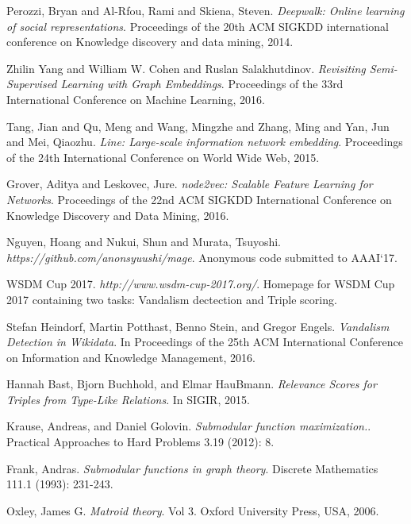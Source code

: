 \documentclass[12pt,twoside]{article}
\begin{document}
\begin{thebibliography}{99}

Perozzi, Bryan and Al-Rfou, Rami and Skiena, Steven. \textit{Deepwalk: Online learning of social representations}. Proceedings of the 20th ACM SIGKDD international conference on Knowledge discovery and data mining, 2014.

Zhilin Yang and William W. Cohen and Ruslan Salakhutdinov. \textit{Revisiting Semi-Supervised Learning with Graph Embeddings}. Proceedings of the 33rd International Conference on Machine Learning, 2016.

Tang, Jian and Qu, Meng and Wang, Mingzhe and Zhang, Ming and Yan, Jun and Mei, Qiaozhu. \textit{Line: Large-scale information network embedding}. Proceedings of the 24th International Conference on World Wide Web, 2015.

Grover, Aditya and Leskovec, Jure. \textit{node2vec: Scalable Feature Learning for Networks}. Proceedings of the 22nd ACM SIGKDD International Conference on Knowledge Discovery and Data Mining, 2016.

Nguyen, Hoang and Nukui, Shun and Murata, Tsuyoshi. \textit{https://github.com/anonsyuushi/mage}. Anonymous code submitted to AAAI`17.

WSDM Cup 2017. \textit{http://www.wsdm-cup-2017.org/}. Homepage for WSDM Cup 2017 containing two tasks: Vandalism dectection and Triple scoring.

Stefan Heindorf, Martin Potthast, Benno Stein, and Gregor Engels. \textit{Vandalism Detection in Wikidata}. In Proceedings of the 25th ACM International Conference on Information and Knowledge Management, 2016.

Hannah Bast, Bjorn Buchhold, and Elmar HauBmann. \textit{Relevance Scores for Triples from Type-Like Relations}. In SIGIR, 2015.

Krause, Andreas, and Daniel Golovin. \textit{Submodular function maximization.}. Practical Approaches to Hard Problems 3.19 (2012): 8.

Frank, Andras. \textit{Submodular functions in graph theory}. Discrete Mathematics 111.1 (1993): 231-243.

Oxley, James G. \textit{Matroid theory}. Vol 3. Oxford University Press, USA, 2006.

\end{thebibliography}
\end{document}

